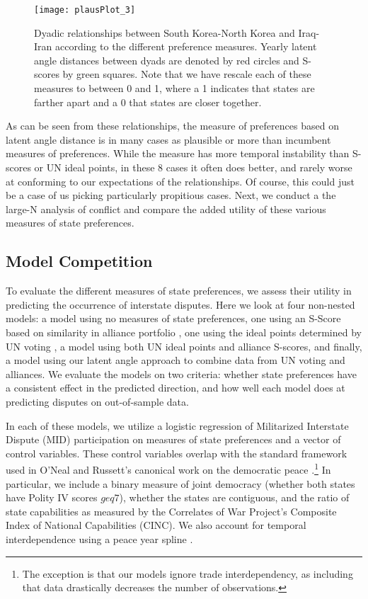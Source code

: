 \begin{figure}
	\centering
	\texttt{[image: plausPlot\_3]}
	\caption{Dyadic relationships between South Korea-North Korea and Iraq-Iran according to the different preference measures. Yearly latent angle distances between dyads are denoted by red circles and S-scores by green squares. Note that we have rescale each of these measures to between 0 and 1, where a 1 indicates that states are farther apart and a 0 that states are closer together.}
	\label{missing:dyads}
\end{figure}

As can be seen from these relationships, the measure of preferences based on latent angle distance is in many cases as plausible or more than incumbent measures of preferences. While the measure has more temporal instability than S-scores or UN ideal points, in these 8 cases it often does better, and rarely worse at conforming to our expectations of the relationships. Of course, this could just be a case of us picking particularly propitious cases. Next, we conduct a the large-N analysis of conflict and compare the added utility of these various measures of state preferences.

\subsection*{Model Competition}

To evaluate the different measures of state preferences, we assess their utility in predicting the occurrence of interstate disputes. Here we look at four non-nested models: a model using no measures of state preferences, one using an S-Score based on similarity in alliance portfolio \citep{signorino:ritter:1999}, one using the ideal points determined by UN voting \citep{bailey:etal:2015}, a model using both UN ideal points and alliance S-scores, and finally, a model using our latent angle approach to combine data from UN voting and alliances. We evaluate the models on two criteria: whether state preferences have a consistent effect in the predicted direction, and how well each model does at predicting disputes on out-of-sample data.

In each of these models, we utilize a logistic regression of Militarized Interstate Dispute (MID) participation on measures of state preferences and a vector of control variables. These control variables overlap with the standard framework used in O'Neal and Russett's canonical work on the democratic peace \citep{oneal:russett:1997}.\footnote{The exception is that our models ignore trade interdependency, as including that data drastically decreases the number of observations.} In particular, we include a binary measure of joint democracy (whether both states have Polity IV scores $geq 7$), whether the states are contiguous, and the ratio of state capabilities as measured by the Correlates of War Project's Composite Index of National Capabilities (CINC). We also account for temporal interdependence using a peace year spline \citep{carter:signorino:2010}. 

